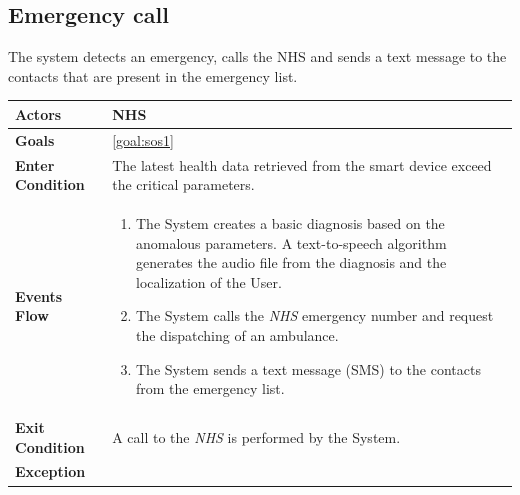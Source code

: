   \subsection{Emergency call}
The system detects an emergency, calls the NHS and sends a text message to the contacts that are present in the emergency list.

\begin{table}[H]
	\centering
    
    \begin{tabular}{|p{3.5cm}|p{10.3cm}|}
    
    \hline
    \textbf{\large{Actors}}  			& NHS						     \\
    				 					
    \hline
    \textbf{\large{Goals}} 				& \ref{goal:sos1}                \\
    
    \hline
    \textbf{\large{Enter Condition}}	& The latest health data retrieved from the smart device exceed the critical parameters.		\\
    
    \hline
    \textbf{\large{Events Flow}}		& \begin{enumerate}[leftmargin=0.5cm]
                                          	\item The System creates a basic diagnosis based on the anomalous parameters. A text-to-speech algorithm generates the audio file from the diagnosis and the localization of the User.
                                            \item The System calls the \emph{NHS} emergency number and request the dispatching of an ambulance.
                                            \item The System sends a text message (SMS) to the contacts from the emergency list.
                                      \end{enumerate}
    										\\
    \hline
    \textbf{\large{Exit Condition}} 	& A call to the \emph{NHS} is performed by the System. \\
    
    \hline
    \textbf{\large{Exception}} 			&  \\
    								
    \hline
    
    \end{tabular}
	
\end{table}
